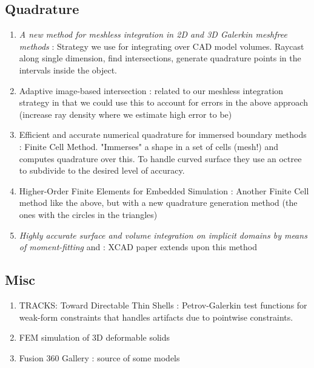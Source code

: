 \subsection{Quadrature}
\begin{enumerate}
    \item \textit{A new method for meshless integration in 2D and 3D Galerkin meshfree methods} \cite{KHOSRAVIFARD201030}: Strategy we use for integrating over CAD model volumes. Raycast along single dimension, find intersections, generate quadrature points in the intervals inside the object.
    \item Adaptive image-based intersection \cite{DBLP:journals/tog/WangFP12}: related to our meshless integration strategy in that we could use this to account for errors in the above approach (increase ray density where we estimate high error to be)
    \item Efficient and accurate numerical quadrature for immersed boundary methods \cite{10.1186/s40323-015-0031-y}: Finite Cell Method. "Immerses" a shape in a set of cells (mesh!) and computes quadrature over this. To handle curved surface they use an octree to subdivide to the desired level of accuracy.
    \item Higher-Order Finite Elements for Embedded Simulation \cite{10.1145/3414685.3417853}: Another Finite Cell method like the above, but with a new quadrature generation method (the ones with the circles in the triangles)
    \item \textit{Highly accurate surface and volume integration on implicit domains by means of moment-fitting} \cite{https://doi.org/10.1002/nme.4569} and \cite{https://doi.org/10.1002/nme.5343}: XCAD paper extends upon this method 
\end{enumerate}

\subsection{Misc}
\begin{enumerate}
	\item TRACKS: Toward Directable Thin Shells \cite{10.1145/1276377.1276439}: Petrov-Galerkin test functions for weak-form constraints that handles artifacts due to pointwise constraints.
    \item FEM simulation of 3D deformable solids \cite{10.1145/2343483.2343501}
    \item Fusion 360 Gallery \cite{willis2020fusion} : source of some models
\end{enumerate}